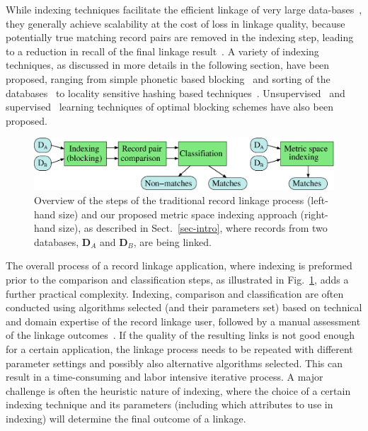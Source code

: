 \documentclass{llncs}
\begin{document}
While indexing techniques facilitate the efficient linkage of very
large data-bases~\cite{Don15}, they generally achieve scalability at
the cost of loss in linkage quality, because potentially true matching
record pairs are removed in the indexing step, leading to a reduction
in recall of the final linkage result~\cite{Chr12}. A variety of
indexing techniques, as discussed in more details in the following
section, have been proposed, ranging from simple phonetic based
blocking~\cite{Chr12} and sorting of the databases~\cite{Dra12} to
locality sensitive hashing based techniques~\cite{Kim10,Steorts2014}.
Unsupervised~\cite{Kej13,Ram15} and supervised~\cite{Bil06,Mic06} 
learning techniques of optimal blocking schemes have also been
proposed.

\begin{figure}[!t]
  \centering
  \includegraphics[width=1.0\textwidth]{figures/linkage-process}
  \caption{Overview of the steps of the traditional record linkage
           process (left-hand size) and our proposed metric space
           indexing approach (right-hand size), as described in
           Sect.~\ref{sec-intro}, where records from two databases,
           $\mathbf{D}_A$ and $\mathbf{D}_B$, are being linked.}
           \label{fig-rl-process}
\end{figure}

The overall process of a record linkage application, where indexing is
preformed prior to the comparison and classification steps, as
illustrated in Fig.~\ref{fig-rl-process}, adds a further practical
complexity. Indexing, comparison and classification are often conducted
using algorithms selected (and their parameters set) based on technical
and domain expertise of the record linkage user, followed by a manual
assessment of the linkage outcomes~\cite{Chr12}. If the quality of the
resulting links is not good enough for a certain application, the
linkage process needs to be repeated with different parameter settings
and possibly also alternative algorithms selected. This can result in
a time-consuming and labor intensive iterative process. A major
challenge is often the heuristic nature of indexing, where the choice
of a certain indexing technique and its parameters (including which
attributes to use in indexing) will determine the final outcome of a
linkage.
\end{document}
